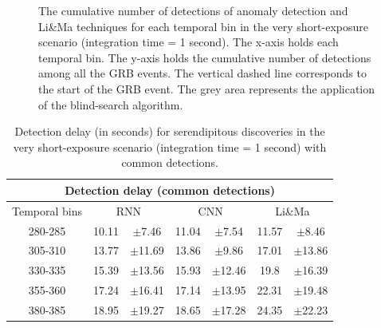 \begin{figure}[!ht]
\centering

\captionsetup{width=0.9\linewidth}
\caption{The cumulative number of detections of anomaly detection and Li\&Ma techniques for each temporal bin in the very short-exposure scenario (integration time = 1 second). The x-axis holds each temporal bin. The y-axis holds the cumulative number of detections among all the GRB events. The vertical dashed line corresponds to the start of the GRB event. The grey area represents the application of the blind-search algorithm.}
\label{f:serendipitous-discoveries-itime-1}
\end{figure}

 
\begin{table}[!ht]
\centering
\begin{tabular}{|c|cc|cc|cc|} 
\hline
\multicolumn{7}{|c|}{\textbf{Detection delay} (common detections)} \\ 
\hline
\multicolumn{1}{|c|}{Temporal bins} & \multicolumn{2}{c|}{RNN} & \multicolumn{2}{c|}{CNN} & \multicolumn{2}{c|}{Li\&Ma} \\ 
\hline
280-285 & 10.11 &  $\pm$7.46 & 11.04 &  $\pm$7.54  & 11.57 &  $\pm$8.46\\
305-310 & 13.77 & $\pm$11.69 & 13.86 &  $\pm$9.86 & 17.01 & $\pm$13.86\\
330-335 & 15.39 & $\pm$13.56 & 15.93 & $\pm$12.46 & 19.8 & $\pm$16.39 \\
355-360 & 17.24 & $\pm$16.41 & 17.14 & $\pm$13.95 & 22.31 & $\pm$19.48 \\
380-385 & 18.95 & $\pm$19.27 & 18.65 & $\pm$17.28 & 24.35 &$\pm$22.23 \\
\hline
\end{tabular}
\caption{Detection delay (in seconds) for serendipitous discoveries in the very short-exposure scenario (integration time = 1 second) with common detections.}
\label{tab:dd-itime-1-common}
\end{table}




\FloatBarrier
